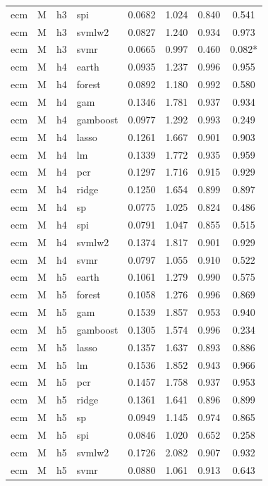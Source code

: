 \begin{ThreePartTable}
\begin{longtable}[t]{llclcccc}
ecm & M & h3 & spi & 0.0682 & 1.024 & 0.840 & 0.541\\
ecm & M & h3 & svmlw2 & 0.0827 & 1.240 & 0.934 & 0.973\\
ecm & M & h3 & svmr & 0.0665 & 0.997 & 0.460 & 0.082*\\
\addlinespace
ecm & M & h4 & earth & 0.0935 & 1.237 & 0.996 & 0.955\\
ecm & M & h4 & forest & 0.0892 & 1.180 & 0.992 & 0.580\\
ecm & M & h4 & gam & 0.1346 & 1.781 & 0.937 & 0.934\\
ecm & M & h4 & gamboost & 0.0977 & 1.292 & 0.993 & 0.249\\
ecm & M & h4 & lasso & 0.1261 & 1.667 & 0.901 & 0.903\\
ecm & M & h4 & lm & 0.1339 & 1.772 & 0.935 & 0.959\\
ecm & M & h4 & pcr & 0.1297 & 1.716 & 0.915 & 0.929\\
ecm & M & h4 & ridge & 0.1250 & 1.654 & 0.899 & 0.897\\
ecm & M & h4 & sp & 0.0775 & 1.025 & 0.824 & 0.486\\
ecm & M & h4 & spi & 0.0791 & 1.047 & 0.855 & 0.515\\
ecm & M & h4 & svmlw2 & 0.1374 & 1.817 & 0.901 & 0.929\\
ecm & M & h4 & svmr & 0.0797 & 1.055 & 0.910 & 0.522\\
\addlinespace
ecm & M & h5 & earth & 0.1061 & 1.279 & 0.990 & 0.575\\
ecm & M & h5 & forest & 0.1058 & 1.276 & 0.996 & 0.869\\
ecm & M & h5 & gam & 0.1539 & 1.857 & 0.953 & 0.940\\
ecm & M & h5 & gamboost & 0.1305 & 1.574 & 0.996 & 0.234\\
ecm & M & h5 & lasso & 0.1357 & 1.637 & 0.893 & 0.886\\
ecm & M & h5 & lm & 0.1536 & 1.852 & 0.943 & 0.966\\
ecm & M & h5 & pcr & 0.1457 & 1.758 & 0.937 & 0.953\\
ecm & M & h5 & ridge & 0.1361 & 1.641 & 0.896 & 0.899\\
ecm & M & h5 & sp & 0.0949 & 1.145 & 0.974 & 0.865\\
ecm & M & h5 & spi & 0.0846 & 1.020 & 0.652 & 0.258\\
ecm & M & h5 & svmlw2 & 0.1726 & 2.082 & 0.907 & 0.932\\
ecm & M & h5 & svmr & 0.0880 & 1.061 & 0.913 & 0.643\\

\end{longtable}
\end{ThreePartTable}
